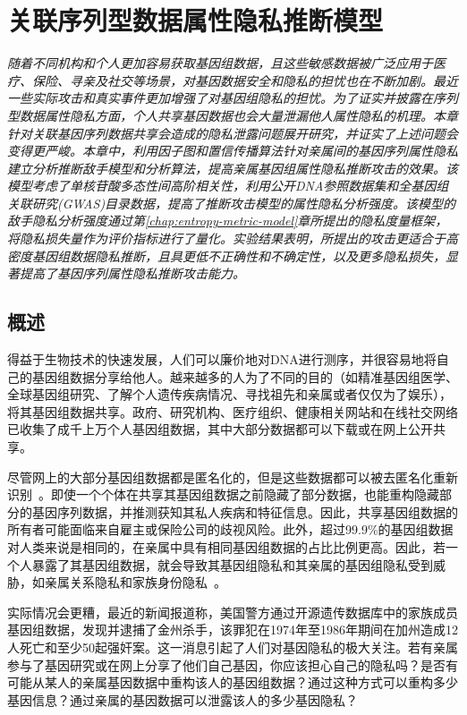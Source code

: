 \chapter{关联序列型数据属性隐私推断模型}
\label{chap:inference-attack-on-related-sequenced-data}
\textit{ }

\textit{随着不同机构和个人更加容易获取基因组数据，且这些敏感数据被广泛应用于医疗、保险、寻亲及社交等场景，对基因数据安全和隐私的担忧也在不断加剧。最近一些实际攻击和真实事件更加增强了对基因组隐私的担忧。为了证实并披露在序列型数据属性隐私方面，个人共享基因数据也会大量泄漏他人属性隐私的机理。本章针对关联基因序列数据共享会造成的隐私泄露问题展开研究，并证实了上述问题会变得更严峻。本章中，利用因子图和置信传播算法针对亲属间的基因序列属性隐私建立分析推断敌手模型和分析算法，提高亲属基因组属性隐私推断攻击的效果。该模型考虑了单核苷酸多态性间高阶相关性，利用公开DNA参照数据集和全基因组关联研究(GWAS)目录数据，提高了推断攻击模型的属性隐私分析强度。该模型的敌手隐私分析强度通过第\ref{chap:entropy-metric-model}章所提出的隐私度量框架，将隐私损失量作为评价指标进行了量化。实验结果表明，所提出的攻击更适合于高密度基因组数据隐私推断，且具更低不正确性和不确定性，以及更多隐私损失，显著提高了基因序列属性隐私推断攻击能力。}

\section{概述}
得益于生物技术的快速发展，人们可以廉价地对DNA进行测序，并很容易地将自己的基因组数据分享给他人。越来越多的人为了不同的目的（如精准基因组医学、全球基因组研究、了解个人遗传疾病情况、寻找祖先和亲属或者仅仅为了娱乐），将其基因组数据共享。政府、研究机构、医疗组织、健康相关网站和在线社交网络已收集了成千上万个人基因组数据，其中大部分数据都可以下载或在网上公开共享。

尽管网上的大部分基因组数据都是匿名化的，但是这些数据都可以被去匿名化重新识别~\cite{greenbaum2008genomic,humbert2015de}。即使一个个体在共享其基因组数据之前隐藏了部分数据，也能重构隐藏部分的基因序列数据，并推测获知其私人疾病和特征信息。因此，共享基因组数据的所有者可能面临来自雇主或保险公司的歧视风险。此外，超过99.9\%的基因组数据对人类来说是相同的，在亲属中具有相同基因组数据的占比比例更高。因此，若一个人暴露了其基因组数据，就会导致其基因组隐私和其亲属的基因组隐私受到威胁，如亲属关系隐私和家族身份隐私~\cite{rohlfs2012familial}。


实际情况会更糟，最近的新闻报道称，美国警方通过开源遗传数据库中的家族成员基因组数据，发现并逮捕了金州杀手，该罪犯在1974年至1986年期间在加州造成12人死亡和至少50起强奸案。这一消息引起了人们对基因隐私的极大关注。若有亲属参与了基因研究或在网上分享了他们自己基因，你应该担心自己的隐私吗？是否有可能从某人的亲属基因数据中重构该人的基因组数据？通过这种方式可以重构多少基因信息？通过亲属的基因数据可以泄露该人的多少基因隐私？

